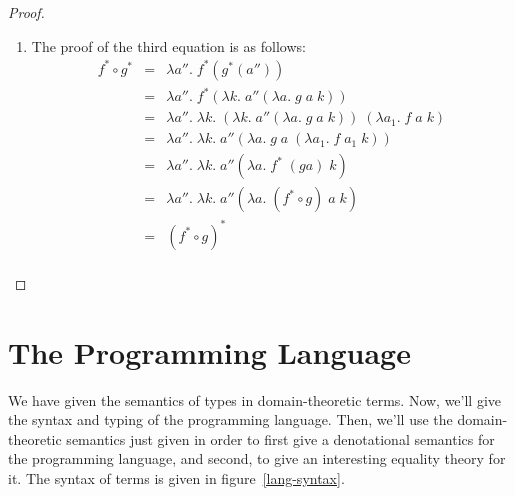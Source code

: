 \begin{proof}
\begin{enumerate}
\item The proof of the third equation is as follows: 
  \begin{displaymath}
    \begin{array}{lcl}
      f^* \circ g^* 
      & = & \lambda a''.\; f^*(g^*(a'')) \\
      & = & \lambda a''.\; f^*(\lambda k.\;a''(\lambda a.\;g\;a\;k)) \\
      & = & \lambda a''.\;\lambda k.\;
              (\lambda k.\;a''(\lambda a.\;g\;a\;k))\;
              (\lambda a_1.\; f\;a\;k) \\
      & = & \lambda a''.\;\lambda k.\;
              a''(\lambda a.\;g\;a\;(\lambda a_1.\;f\;a_1\;k)) \\
      & = & \lambda a''.\;\lambda k.\;
               a''(\lambda a.\;f^*\; (g a)\; k) \\
      & = & \lambda a''.\;\lambda k.\;
               a''(\lambda a.\;(f^* \circ g)\;a\;k) \\
      & = & (f^* \circ g)^* \\       
    \end{array}
  \end{displaymath}
\end{enumerate}
\end{proof}




\section{The Programming Language}

We have given the semantics of types in domain-theoretic terms. Now,
we'll give the syntax and typing of the programming language. Then,
we'll use the domain-theoretic semantics just given in order to first
give a denotational semantics for the programming language, and
second, to give an interesting equality theory for it. The syntax of 
terms is given in figure~\ref{lang-syntax}. 


